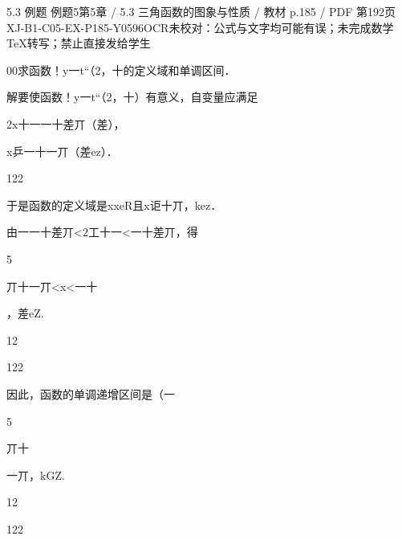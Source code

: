 \begin{bankitem}{5.3 例题 例题5}{第5章 / 5.3 三角函数的图象与性质 / 教材 p.185 / PDF 第192页}{XJ-B1-C05-EX-P185-Y0596}{OCR未校对：公式与文字均可能有误；未完成数学TeX转写；禁止直接发给学生}
\begin{ocrdraft}
\par
00求函数！y一t“（2，十的定义域和单调区间．
\par
解要使函数！y一t“（2，十）有意义，自变量应满足
\par
2x十一一十差丌（差），
\par
x乒一十一丌（差ez）．
\par
122
\par
于是函数的定义域是xxeR且x讵十丌，kez．
\par
由一一十差丌<2工十一<一十差丌，得
\par
5
\par
丌十一丌<x<一十
\par
，差eZ.
\par
12
\par
122
\par
因此，函数的单调递增区间是（一
\par
5
\par
丌十
\par
一丌，kGZ.
\par
12
\par
122
\end{ocrdraft}
\end{bankitem}
